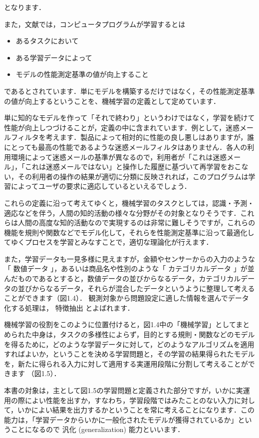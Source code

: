 となります．


また，文献\cite{mitchell97}では，コンピュータプログラムが学習するとは
\begin{itemize}
\item あるタスクにおいて
\item ある学習データによって
\item モデルの性能測定基準の値が向上すること
\end{itemize}
であるとされています．単にモデルを構築するだけではなく，その性能測定基準の値が向上するということを、機械学習の定義として定めています．

単に知的なモデルを作って「それで終わり」というわけではなく，学習を続けて性能が向上しつづけることが，定義の中に含まれています．例として，迷惑メールフィルタを考えます．製品によって相対的に性能の良し悪しはありますが，誰にとっても最高の性能であるような迷惑メールフィルタはありません．各人の利用環境によって迷惑メールの基準が異なるので，利用者が「これは迷惑メール」，「これは迷惑メールではない」と操作した履歴に基づいて再学習をおこない，その利用者の操作の結果が適切に分類に反映されれば，このプログラムは学習によってユーザの要求に適応しているといえるでしょう．

これらの定義に沿って考えてゆくと，機械学習のタスクとしては，認識・予測・適応などを伴う，人間の知的活動の様々な分野がその対象となりそうです．これらは人間の高度な知的活動なので実現するのは非常に難しそうですが，これらの機能を規則や関数などでモデル化して，それらを性能測定基準に沿って最適化してゆくプロセスを学習とみなすことで，適切な理論化が行えます．


また，学習データも一見多様に見えますが，金額やセンサーからの入力のような「
数値データ
」，あるいは商品名や性別のような「
カテゴリカルデータ
」が並んだものであるとすると，数値データの並びからなるデータ，カテゴリカルデータの並びからなるデータ，それらが混合したデータというように整理して考えることができます（図1.4）．
観測対象から問題設定に適した情報を選んでデータ化する処理は，
特徴抽出
とよばれます．

機械学習の役割をこのように位置付けると，図1.4中の「機械学習」としてまとめられた中身は，タスクの多様性によらず，目的とする規則・関数などのモデルを得るために，どのような学習データに対して，どのようなアルゴリズムを適用すればよいか，ということを決める学習問題と，その学習の結果得られたモデルを，新たに得られる入力に対して適用する実運用段階に分割して考えることができます
（図1.5）．

本書の対象は，主として図1.5の学習問題と定義された部分ですが，いかに実運用の際によい性能を出すか，すなわち，学習段階ではみたことのない入力に対して，いかによい結果を出力するかということを常に考えることになります．この能力は，「学習データからいかに一般化されたモデルが獲得されているか」ということになるので
汎化 (generalization) 
能力といいます．


